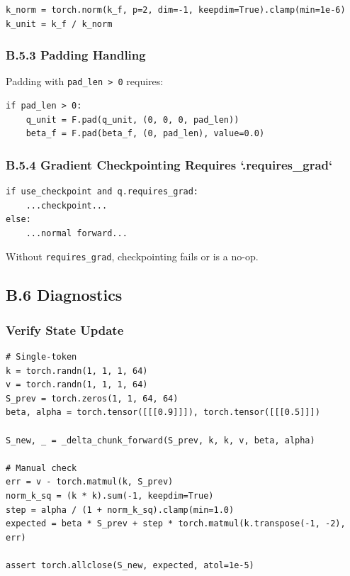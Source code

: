 \begin{lstlisting}
k_norm = torch.norm(k_f, p=2, dim=-1, keepdim=True).clamp(min=1e-6)
k_unit = k_f / k_norm
\end{lstlisting}

\subsubsection{B.5.3 Padding Handling}

Padding with \texttt{pad\_len > 0} requires:

\begin{lstlisting}
if pad_len > 0:
    q_unit = F.pad(q_unit, (0, 0, 0, pad_len))
    beta_f = F.pad(beta_f, (0, pad_len), value=0.0)
\end{lstlisting}

\subsubsection{B.5.4 Gradient Checkpointing Requires `.requires\_grad`}

\begin{lstlisting}
if use_checkpoint and q.requires_grad:
    ...checkpoint...
else:
    ...normal forward...
\end{lstlisting}

Without \texttt{requires\_grad}, checkpointing fails or is a no-op.

\subsection{B.6 Diagnostics}

\subsubsection{Verify State Update}

\begin{lstlisting}
# Single-token
k = torch.randn(1, 1, 1, 64)
v = torch.randn(1, 1, 1, 64)
S_prev = torch.zeros(1, 1, 64, 64)
beta, alpha = torch.tensor([[[0.9]]]), torch.tensor([[[0.5]]])

S_new, _ = _delta_chunk_forward(S_prev, k, k, v, beta, alpha)

# Manual check
err = v - torch.matmul(k, S_prev)
norm_k_sq = (k * k).sum(-1, keepdim=True)
step = alpha / (1 + norm_k_sq).clamp(min=1.0)
expected = beta * S_prev + step * torch.matmul(k.transpose(-1, -2), err)

assert torch.allclose(S_new, expected, atol=1e-5)
\end{lstlisting}

